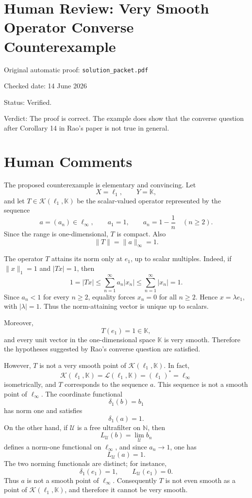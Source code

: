 \documentclass[11pt]{article}
\begin{document}
\section*{Human Review: Very Smooth Operator Converse Counterexample}

\noindent Original automatic proof: \texttt{solution\_packet.pdf}

\noindent Checked date: 14 June 2026

\noindent Status: Verified.

\noindent Verdict: The proof is correct. The example does show that the converse question after Corollary 14 in Rao's paper is not true in general.

\section*{Human Comments}

The proposed counterexample is elementary and convincing. Let
\[
X=\ell_1,\qquad Y=\mathbb K,
\]
and let \(T\in \mathcal K(\ell_1,\mathbb K)\) be the scalar-valued operator represented by the sequence
\[
a=(a_n)\in \ell_\infty,\qquad
a_1=1,\qquad a_n=1-\frac1n \quad (n\geq 2).
\]
Since the range is one-dimensional, \(T\) is compact. Also
\[
\|T\|=\|a\|_\infty=1.
\]

The operator \(T\) attains its norm only at \(e_1\), up to scalar multiples. Indeed, if \(\|x\|_1=1\) and \(|Tx|=1\), then
\[
1=|Tx|
\leq \sum_{n=1}^\infty a_n |x_n|
\leq \sum_{n=1}^\infty |x_n|
=1.
\]
Since \(a_n<1\) for every \(n\geq 2\), equality forces \(x_n=0\) for all \(n\geq 2\). Hence \(x=\lambda e_1\), with \(|\lambda|=1\). Thus the norm-attaining vector is unique up to scalars.

Moreover,
\[
T(e_1)=1\in \mathbb K,
\]
and every unit vector in the one-dimensional space \(\mathbb K\) is very smooth. Therefore the hypotheses suggested by Rao's converse question are satisfied.

However, \(T\) is not a very smooth point of \(\mathcal K(\ell_1,\mathbb K)\). In fact,
\[
\mathcal K(\ell_1,\mathbb K)=\mathcal L(\ell_1,\mathbb K)=(\ell_1)^*=\ell_\infty
\]
isometrically, and \(T\) corresponds to the sequence \(a\). This sequence is not a smooth point of \(\ell_\infty\). The coordinate functional
\[
\delta_1(b)=b_1
\]
has norm one and satisfies
\[
\delta_1(a)=1.
\]
On the other hand, if \(\mathcal U\) is a free ultrafilter on \(\mathbb N\), then
\[
L_{\mathcal U}(b)=\lim_{\mathcal U} b_n
\]
defines a norm-one functional on \(\ell_\infty\), and since \(a_n\to 1\), one has
\[
L_{\mathcal U}(a)=1.
\]
The two norming functionals are distinct; for instance,
\[
\delta_1(e_1)=1,\qquad L_{\mathcal U}(e_1)=0.
\]
Thus \(a\) is not a smooth point of \(\ell_\infty\). Consequently \(T\) is not even smooth as a point of \(\mathcal K(\ell_1,\mathbb K)\), and therefore it cannot be very smooth.
\end{document}
